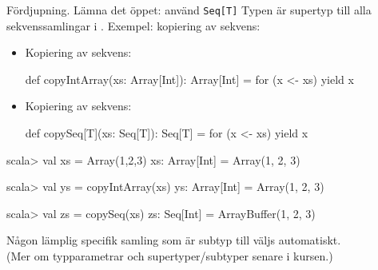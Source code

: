 \begin{Slide}{Fördjupning. Lämna det öppet: använd \texttt{Seq[T]}}\SlideFontSmall
Typen  är supertyp till alla sekvenssamlingar i .
\pause Exempel: kopiering av sekvens:
\begin{itemize}
\item Kopiering av  sekvens:
\begin{Code}
def copyIntArray(xs: Array[Int]): Array[Int] = for (x <- xs) yield x
\end{Code}

\item Kopiering av  sekvens:
\begin{Code}
def copySeq[T](xs: Seq[T]): Seq[T] = for (x <- xs) yield x
\end{Code}
\end{itemize}
\pause
\begin{REPL}
  scala> val xs = Array(1,2,3)
  xs: Array[Int] = Array(1, 2, 3)

  scala> val ys = copyIntArray(xs)
  ys: Array[Int] = Array(1, 2, 3)

  scala> val zs = copySeq(xs)
  zs: Seq[Int] = ArrayBuffer(1, 2, 3)
\end{REPL}
Någon lämplig specifik samling som är subtyp till  väljs automatiskt. \\
(Mer om typparametrar och supertyper/subtyper senare i kursen.)
%
%
\end{Slide}






